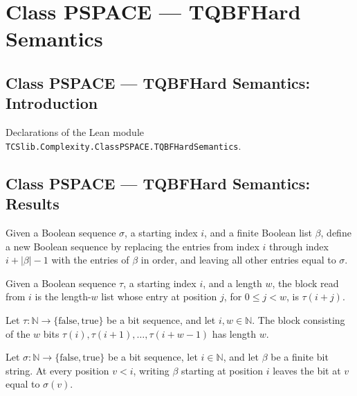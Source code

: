 \section{Class PSPACE --- TQBFHard Semantics}
\subsection*{Class PSPACE --- TQBFHard Semantics: Introduction}

Declarations of the Lean module \texttt{TCSlib.Complexity.ClassPSPACE.TQBFHardSemantics}.

\subsection*{Class PSPACE --- TQBFHard Semantics: Results}

\begin{definition}
\label{Complexity.TQBFHard.writeBlock}
\leanok
Given a Boolean sequence $\sigma$, a starting index $i$, and a finite Boolean list
$\beta$, define a new Boolean sequence by replacing the entries from index $i$ through
index $i+|\beta|-1$ with the entries of $\beta$ in order, and leaving all other entries
equal to $\sigma$.
\end{definition}

\begin{definition}
\label{Complexity.TQBFHard.readBlock}
\leanok
Given a Boolean sequence $\tau$, a starting index $i$, and a length $w$, the block read
from $i$ is the length-$w$ list whose entry at position $j$, for $0\le j<w$, is
$\tau(i+j)$.
\end{definition}

\begin{theorem}
\label{Complexity.TQBFHard.length_readBlock}
\leanok
{}
Let $\tau:\mathbb{N}\to\{\mathrm{false},\mathrm{true}\}$ be a bit sequence, and let
$i,w\in\mathbb{N}$. The block consisting of the $w$ bits
$\tau(i),\tau(i+1),\ldots,\tau(i+w-1)$ has length $w$.
\end{theorem}

\begin{theorem}
\label{Complexity.TQBFHard.writeBlock_of_lt}
\leanok
{}
Let $\sigma:\mathbb{N}\to\{\mathrm{false},\mathrm{true}\}$ be a bit sequence, let
$i\in\mathbb{N}$, and let $\beta$ be a finite bit string. At every position $v<i$,
writing $\beta$ starting at position $i$ leaves the bit at $v$ equal to $\sigma(v)$.
\end{theorem}

